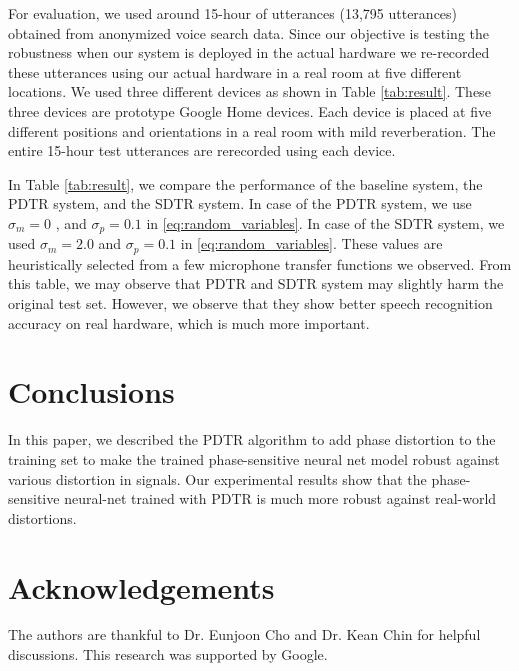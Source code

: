\documentclass[a4paper]{article}
\begin{document}
For evaluation, we used around 15-hour of utterances (13,795 utterances)
obtained from anonymized voice search data. Since our objective is
testing the robustness when our system is deployed in the actual hardware
we re-recorded these utterances using our actual hardware in a real room
at five different locations. We used three different devices as shown in
Table \ref{tab:result}. These three devices are prototype Google
Home devices. Each device is placed at five different positions and
orientations in a real room with mild reverberation. The entire
15-hour test utterances are rerecorded using each device.

In Table \ref{tab:result}, we compare the performance of
the baseline system, the PDTR system, and the SDTR system.
In case of the PDTR system, we use $\sigma_m = 0$ , and
 $\sigma_p = 0.1$ in \eqref{eq:random_variables}. In case of
 the SDTR system, we used $\sigma_m = 2.0$ and $\sigma_p = 0.1$
in \eqref{eq:random_variables}. These values are heuristically
selected from a few microphone transfer functions we observed.
From this table, we may observe
that PDTR and SDTR system may slightly harm the original
test set. However, we observe that they show better speech recognition
accuracy on real hardware, which is much more important.







\section{Conclusions}
In this paper, we described the PDTR algorithm to add phase distortion
to the training set to make  the trained phase-sensitive neural net
model robust against various distortion in signals. Our experimental
results show that the phase-sensitive neural-net trained with PDTR is
much more robust against real-world distortions.

\section{Acknowledgements}
The authors are thankful to Dr. Eunjoon Cho and Dr. Kean Chin for helpful
discussions. This research was supported by Google.

\newpage


\end{document}
